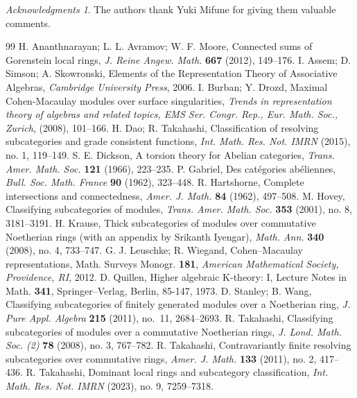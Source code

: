 \documentclass{amsart}
\theoremstyle{definition}
\theoremstyle{remark}
\newtheorem*{ac}{Acknowledgments}
\begin{document}
\begin{ac}
The authors thank Yuki Mifune for giving them valuable comments.
\end{ac}

\begin{thebibliography}{99}
{\sc H. Ananthnarayan; \sc L. L. Avramov; \sc W. F. Moore}, Connected sums of Gorenstein local rings, {\em J. Reine Angew. Math.} {\bf 667} (2012), 149--176.
{\sc I. Assem; \sc D. Simson; \sc A. Skowronski}, Elements of the Representation Theory of Associative Algebras, {\em Cambridge University Press}, 2006.
{\sc I. Burban; \sc Y. Drozd}, Maximal Cohen-Macaulay modules over surface singularities, {\it Trends in representation theory of algebras and related topics, EMS Ser. Congr. Rep., Eur. Math. Soc., Zurich}, (2008), 101--166.
{\sc H. Dao; R. Takahashi}, Classification of resolving subcategories and grade consistent functions, {\em Int. Math. Res. Not. IMRN} (2015), no. 1, 119--149.
{\sc S. E. Dickson}, A torsion theory for Abelian categories, {\em Trans. Amer. Math. Soc.} {\bf 121} (1966), 223--235.
{\sc P. Gabriel}, Des cat\'egories ab\'eliennes, {\em Bull. Soc. Math. France} {\bf 90} (1962), 323--448.
{\sc R. Hartshorne}, Complete intersections and connectedness,
{\em Amer. J. Math.} {\bf 84} (1962), 497--508.
{\sc M. Hovey}, Classifying subcategories of modules, {\em Trans. Amer. Math. Soc.} {\bf 353} (2001), no. 8, 3181--3191.
{\sc H. Krause}, Thick subcategories of modules over commutative Noetherian rings (with an appendix by Srikanth Iyengar), {\em Math. Ann.} {\bf 340} (2008), no. 4, 733--747.
{\sc G. J. Leuschke; R. Wiegand}, Cohen--Macaulay representations, Math. Surveys Monogr. {\bf 181}, {\it American Mathematical Society, Providence, RI}, 2012.
{\sc D. Quillen}, Higher algebraic K-theory: I, Lecture Notes in Math. {\bf 341}, Springer--Verlag, Berlin, 85-147, 1973.
{\sc D. Stanley; \sc B. Wang}, Classifying subcategories of finitely generated modules over a Noetherian ring, {\em J. Pure Appl. Algebra} {\bf 215} (2011), no.~11, 2684--2693.
{\sc R. Takahashi}, Classifying subcategories of modules over a commutative Noetherian rings, {\em J. Lond. Math. Soc. (2)} {\bf 78} (2008), no. 3, 767--782.
{\sc R. Takahashi}, Contravariantly finite resolving subcategories over commutative rings, {\em Amer. J. Math.} {\bf 133} (2011), no. 2, 417--436.
{\sc R. Takahashi}, Dominant local rings and subcategory classification, {\em Int. Math. Res. Not. IMRN} (2023), no. 9, 7259--7318.
\end{thebibliography}
\end{document}
